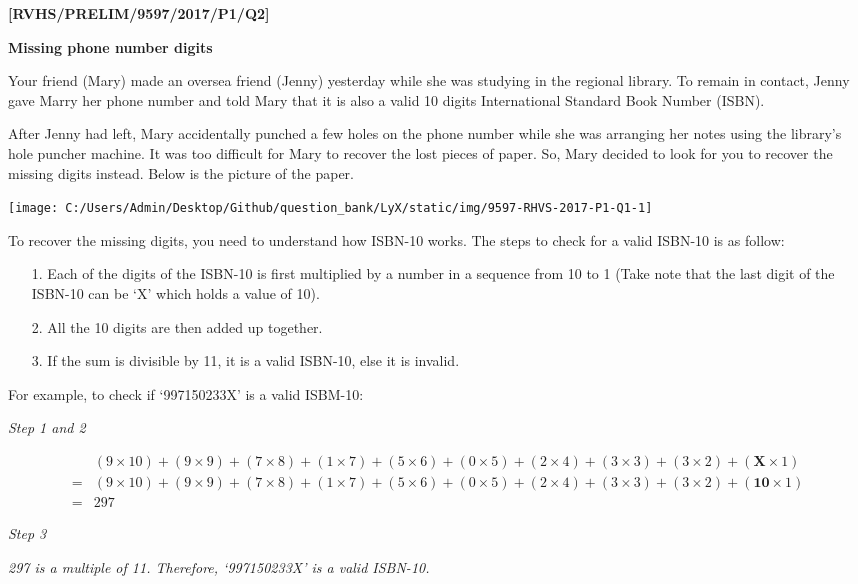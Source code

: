 \item \textbf{{[}RVHS/PRELIM/9597/2017/P1/Q2{]} }

\textbf{Missing phone number digits }

Your friend (Mary) made an oversea friend (Jenny) yesterday while
she was studying in the regional library. To remain in contact, Jenny
gave Marry her phone number and told Mary that it is also a valid
10 digits International Standard Book Number (ISBN). 

After Jenny had left, Mary accidentally punched a few holes on the
phone number while she was arranging her notes using the library\textquoteright s
hole puncher machine. It was too difficult for Mary to recover the
lost pieces of paper. So, Mary decided to look for you to recover
the missing digits instead. Below is the picture of the paper.
\noindent \begin{center}
\texttt{[image: C:/Users/Admin/Desktop/Github/question\_bank/LyX/static/img/9597-RHVS-2017-P1-Q1-1]}
\par\end{center}

To recover the missing digits, you need to understand how ISBN-10
works. The steps to check for a valid ISBN-10 is as follow: 
\begin{enumerate}
\item[1.]  Each of the digits of the ISBN-10 is first multiplied by a number
in a sequence from 10 to 1 (Take note that the last digit of the ISBN-10
can be \textquoteleft X\textquoteright{} which holds a value of 10).
\item[2.]  All the 10 digits are then added up together. 
\item[3.]  If the sum is divisible by 11, it is a valid ISBN-10, else it is
invalid. 
\end{enumerate}
For example, to check if \textquoteleft 997150233X\textquoteright{}
is a valid ISBM-10:

\noindent %
\noindent\begin{minipage}[t]{1\columnwidth}%
\emph{Step 1 and 2}

\emph{
\begin{align*}
 & (9\times10)+(9\times9)+(7\times8)+(1\times7)+(5\times6)+(0\times5)+(2\times4)+(3\times3)+(3\times2)+(\boldsymbol{X}\times1)\\
= & (9\times10)+(9\times9)+(7\times8)+(1\times7)+(5\times6)+(0\times5)+(2\times4)+(3\times3)+(3\times2)+(\boldsymbol{10}\times1)\\
= & 297
\end{align*}
}

\emph{Step 3}

\emph{297 is a multiple of 11. Therefore, \textquoteleft 997150233X\textquoteright{}
is a valid ISBN-10. }%
\end{minipage}

